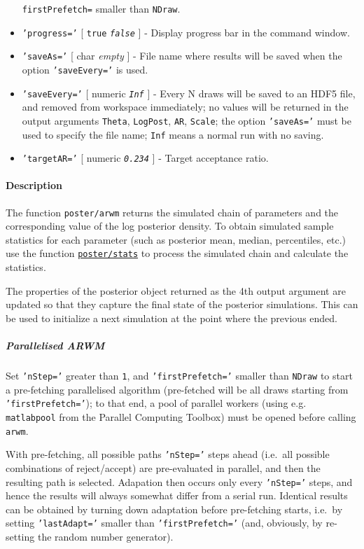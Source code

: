 \begin{itemize}
  \texttt{firstPrefetch=} smaller than \texttt{NDraw}.
\item
  \texttt{'progress='} {[} \texttt{true} \textbar{}
  \emph{\texttt{false}} {]} - Display progress bar in the command
  window.
\item
  \texttt{'saveAs='} {[} char \textbar{} \emph{empty} {]} - File name
  where results will be saved when the option \texttt{'saveEvery='} is
  used.
\item
  \texttt{'saveEvery='} {[} numeric \textbar{} \emph{\texttt{Inf}} {]} -
  Every N draws will be saved to an HDF5 file, and removed from
  workspace immediately; no values will be returned in the output
  arguments \texttt{Theta}, \texttt{LogPost}, \texttt{AR},
  \texttt{Scale}; the option \texttt{'saveAs='} must be used to specify
  the file name; \texttt{Inf} means a normal run with no saving.
\item
  \texttt{'targetAR='} {[} numeric \textbar{} \emph{\texttt{0.234}} {]}
  - Target acceptance ratio.
\end{itemize}

\paragraph{Description}\label{description}

The function \texttt{poster/arwm} returns the simulated chain of
parameters and the corresponding value of the log posterior density. To
obtain simulated sample statistics for each parameter (such as posterior
mean, median, percentiles, etc.) use the function
\href{poster/stats}{\texttt{poster/stats}} to process the simulated
chain and calculate the statistics.

The properties of the posterior object returned as the 4th output
argument are updated so that they capture the final state of the
posterior simulations. This can be used to initialize a next simulation
at the point where the previous ended.

\subparagraph{Parallelised ARWM}\label{parallelised-arwm}

Set \texttt{'nStep='} greater than \texttt{1}, and
\texttt{'firstPrefetch='} smaller than \texttt{NDraw} to start a
pre-fetching parallelised algorithm (pre-fetched will be all draws
starting from \texttt{'firstPrefetch='}); to that end, a pool of
parallel workers (using e.g. \texttt{matlabpool} from the Parallel
Computing Toolbox) must be opened before calling \texttt{arwm}.

With pre-fetching, all possible paths \texttt{'nStep='} steps ahead
(i.e.~all possible combinations of reject/accept) are pre-evaluated in
parallel, and then the resulting path is selected. Adapation then occurs
only every \texttt{'nStep='} steps, and hence the results will always
somewhat differ from a serial run. Identical results can be obtained by
turning down adaptation before pre-fetching starts, i.e.~by setting
\texttt{'lastAdapt='} smaller than \texttt{'firstPrefetch='} (and,
obviously, by re-setting the random number generator).

